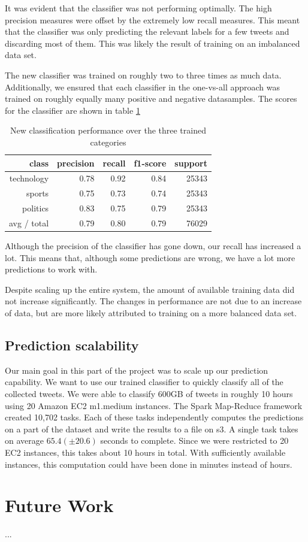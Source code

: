 \documentclass{llncs}
\begin{document}
It was evident that the classifier was not performing optimally. The high precision measures were offset by the extremely low recall measures. This meant that the classifier was only predicting the relevant labels for a few tweets and discarding most of them. This was likely the result of training on an imbalanced data set.

The new classifier was trained on roughly two to three times as much data. Additionally, we ensured that each classifier in the one-vs-all approach was trained on roughly equally many positive and negative datasamples. The scores for the classifier are shown in table \ref{tbl:newclassifier}

\begin{table}
	\begin{center}
		\begin{tabular}{|r|r|r|r|r|} \hline
			class  & precision   & recall & f1-score  & support \\ \hline
			technology    &   0.78 &     0.92  &    0.84   &  25343 \\
			sports   &    0.75   &   0.73   &   0.74   &   25343 \\
			politics   &    0.83  &    0.75   &   0.79   &   25343 \\
			avg / total  &     0.79   &   0.80  &    0.79   &  76029 \\ \hline
		\end{tabular}
	\end{center}
	\caption{New classification performance over the three trained categories}
	\label{tbl:newclassifier}
\end{table}

Although the precision of the classifier has gone down, our recall has increased a lot. This means that, although some predictions are wrong, we have a lot more predictions to work with.

Despite scaling up the entire system, the amount of available training data did not increase significantly. The changes in performance are not due to an increase of data, but are more likely attributed to training on a more balanced data set.

\subsection{Prediction scalability}

Our main goal in this part of the project was to scale up our prediction capability. We want to use our trained classifier to quickly classify all of the collected tweets. We were able to classify 600GB of tweets in roughly 10 hours using 20 Amazon EC2 m1.medium instances. The Spark Map-Reduce framework created 10,702 tasks. Each of these tasks independently computes the predictions on a part of the dataset and write the results to a file on s3. A single task takes on average $65.4 (\pm 20.6)$ seconds to complete. Since we were restricted to 20 EC2 instances, this takes about 10 hours in total. With sufficiently available instances, this computation could have been done in minutes instead of hours.

\section{Future Work}
...






\end{document}

